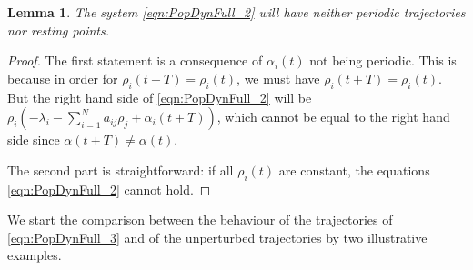 \documentclass{article}
\newtheorem{lemma}{Lemma}[section]
\begin{document}
\begin{lemma}
    The system \eqref{eqn:PopDynFull_2} will have neither periodic trajectories nor resting points.
\end{lemma}
\begin{proof}
The first statement is a consequence of $\alpha_i(t)$ not being periodic. This is because in order for $\rho_i(t+T) = \rho_i(t)$, we must have  $\dot{\rho}_i(t+T) = {\dot{\rho}_i}(t)$. But the right hand side  of \eqref{eqn:PopDynFull_2} will be $\rho_i(-\lambda_i - \sum\limits_{i=1}^N a_{ij}\rho_j + \alpha_i(t+T))$, which cannot be  equal to the right hand side since $\alpha(t+T)\ne \alpha(t)$.

    The second part is straightforward: if all $\rho_i(t)$ are constant, the equations \eqref{eqn:PopDynFull_2} cannot hold. 
\end{proof}
We start the comparison between the behaviour of the trajectories of \eqref{eqn:PopDynFull_3} and of the unperturbed trajectories by two illustrative examples.
\end{document}
